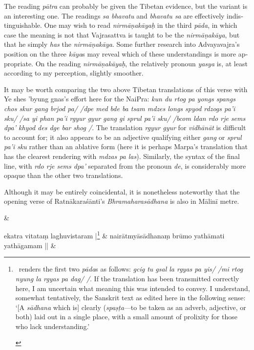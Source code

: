 \documentclass[naipra.tex]{subfiles}
\begin{document}
\begin{sanskrit}
{\begin{english}
		The reading \emph{pātra} can probably be given the Tibetan evidence, but the variant is an interesting one.
		The readings \emph{sa bhavatu} and \emph{bhavatu sa} are effectively indistinguishable.
		One may wish to read \emph{nirmāṇakāyaḥ} in the third \emph{pāda}, in which case the meaning is not that Vajrasattva is taught to be the \emph{nirmāṇakāya}, but that he simply \emph{has} the \emph{nirmāṇakāya}.
		Some further research into Advayavajra's position on the three \emph{kāya}s may reveal which of these understandings is more appropriate.
		On the reading \emph{nirmāṇakāyaḥ}, the relatively pronoun \emph{yasya} is, at least according to my perception, slightly smoother.

		It may be worth comparing the two above Tibetan translations of this verse with Ye shes 'byung gnas's effort here for the NaiPra: \emph{kun du rtog pa yongs spangs chos skur gang brjod pa/ /dpe med bde ba tsam mdzes longs spyod rdzogs pa'i sku/ /sa yi phan pa'i rgyur gyur gang gi sprul pa'i sku/ /bcom ldan rdo rje sems dpa' khyod des dge bar shog /}. 
		The translation \emph{rgyur gyur} for \emph{vidhānāt} is difficult to account for; it also appears to be an adjective qualifying either \emph{gang} or \emph{sprul pa'i sku} rather than an ablative form (here it is perhaps Marpa's translation that has the clearest rendering with \emph{mdzas pa las}).
		Similarly, the syntax of the final line, with \emph{rdo rje sems dpa'} separated from the pronoun \emph{de}, is considerably more opaque than the other two translations.

		Although it may be entirely coincidental, it is nonetheless noteworthy that the opening verse of Ratnākaraśānti's \emph{Bhramaharasādhana} is also in Mālinī metre.
	\end{english}
} \&



\medskip\versequote
ekatra vitataṃ laghuvistaram |\footnote{
	\begin{english}%
		\TIB\ renders the first two \emph{pāda}s as follows: \emph{gcig tu gsal la rgyas pa yis/ /mi rtog nyung la rgyas pa dag/ /}.
		If the translation has been transmitted correctly here, I am uncertain what meaning this was intended to convey. 
		I understand, somewhat tentatively, the Sanskrit text as edited here in the following sense: `[A \emph{sādhana} which is] clearly (\emph{spaṣṭa}—to be taken as an adverb, adjective, or both) laid out in a single place, with a small amount of prolixity for those who lack understanding.'
	\end{english}
} & 
nairātmyāsādhanaṃ brūmo yathāmati yathāgamam || \&


\end{sanskrit}
\end{document}
